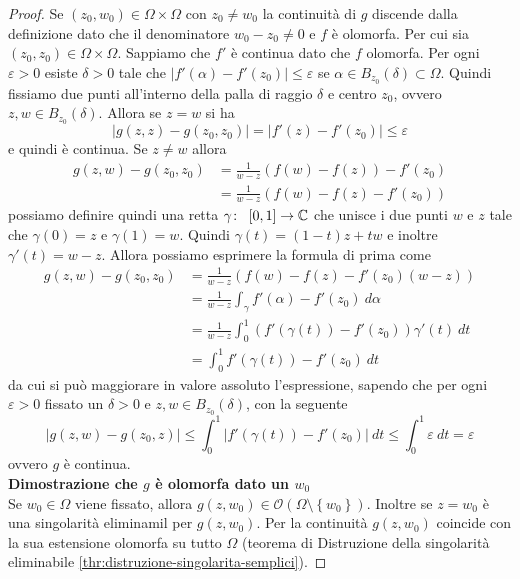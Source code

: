 \begin{proof}
    Se $(z_0, w_0) \in \Omega\times\Omega$ con $z_0 \neq w_0$ la
    continuità di $g$ discende dalla definizione dato che il denominatore
    $w_0 - z_0 \neq 0$ e $f$ è olomorfa. 
    Per cui sia $(z_0, z_0) \in \Omega \times \Omega$. Sappiamo che $f'$
    è continua dato che $f$ olomorfa. Per ogni $\varepsilon > 0$ esiste $\delta
    >0$ tale che $|f'(\alpha) - f'(z_0)| \le \varepsilon$ se $\alpha \in
    B_{z_0}(\delta) \subset \Omega$. Quindi fissiamo due punti all'interno
    della palla di raggio $\delta$ e centro $z_0$, ovvero $z,w \in
    B_{z_0}(\delta)$. Allora se $z = w$ si ha 
    \begin{equation*}
      |g(z,z) - g(z_0,z_0)| = |f'(z) - f'(z_0)| \le \varepsilon
    \end{equation*}
    e quindi è continua. Se $z \neq w$ allora
    \begin{align*}
    g(z,w) - g(z_0, z_0) & = \frac{1}{w-z}(f(w) - f(z)) - f'(z_0) \\
    & = \frac{1}{w-z}(f(w)- f(z) - f'(z_0)) 
    \end{align*}
    possiamo definire quindi una retta $\gamma \colon\ \left[0,1
    \right] \rightarrow \mathbb{C}$ che unisce i due punti $w$ e $z$ tale che 
    $\gamma(0) = z$ e $\gamma(1) = w$. Quindi $\gamma(t) = (1-t)z+ tw$
    e inoltre $\gamma'(t) = w - z$. Allora possiamo esprimere la formula di
    prima come
    \begin{align*}
       g(z,w) - g(z_0, z_0) & = \frac{1}{w-z}(f(w)- f(z) - f'(z_0)(w-z)) \\
        & = \frac{1}{w-z} \int_\gamma f'(\alpha) - f'(z_0)\ d\alpha \\
        & = \frac{1}{w-z} \int^1_0 (f'(\gamma(t)) - f'(z_0)) \gamma'(t)\
        dt \\
        & = \int^1_0 f'(\gamma(t)) - f'(z_0)\ dt
    \end{align*}
    da cui si può maggiorare in valore assoluto l'espressione, sapendo
    che per ogni $\varepsilon > 0$ fissato un $\delta >0$ e $z,w \in
    B_{z_0}(\delta)$, con la seguente
    \begin{equation*}
      |g(z,w) - g(z_0,z)| \le \int^1_0 |f'(\gamma(t)) - f'(z_0)|\ dt \le
      \int^1_0 \varepsilon\ dt = \varepsilon
    \end{equation*}
    ovvero $g$ è continua.\\

   \textbf{Dimostrazione che $g$ è olomorfa dato un $w_0$} \\

   Se $w_0 \in \Omega$ viene fissato, allora $g(z, w_0) \in
   \mathcal{O}(\Omega\setminus\left\{ w_0 \right\})$. Inoltre se $z = w_0$
   è una singolarità eliminamil per $g(z,w_0)$. Per la continuità $g(z,w_0)$
   coincide con la sua estensione olomorfa su tutto $\Omega$ (teorema di
     Distruzione della singolarità eliminabile
   \ref{thr:distruzione-singolarita-semplici}).
 \end{proof}

